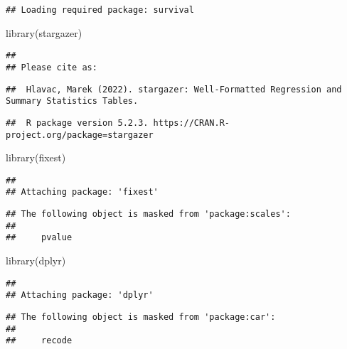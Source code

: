 \documentclass[
]{article}
\newenvironment{Shaded}{\begin{snugshade}}{\end{snugshade}}
\newcommand{\FunctionTok}[1]{\textcolor[rgb]{0.00,0.00,0.00}{#1}}
\newcommand{\NormalTok}[1]{#1}
\begin{document}
\begin{verbatim}
## Loading required package: survival
\end{verbatim}

\begin{Shaded}
\begin{Highlighting}[]
\FunctionTok{library}\NormalTok{(stargazer)}
\end{Highlighting}
\end{Shaded}

\begin{verbatim}
## 
## Please cite as:
\end{verbatim}

\begin{verbatim}
##  Hlavac, Marek (2022). stargazer: Well-Formatted Regression and Summary Statistics Tables.
\end{verbatim}

\begin{verbatim}
##  R package version 5.2.3. https://CRAN.R-project.org/package=stargazer
\end{verbatim}

\begin{Shaded}
\begin{Highlighting}[]
\FunctionTok{library}\NormalTok{(fixest)}
\end{Highlighting}
\end{Shaded}

\begin{verbatim}
## 
## Attaching package: 'fixest'
\end{verbatim}

\begin{verbatim}
## The following object is masked from 'package:scales':
## 
##     pvalue
\end{verbatim}

\begin{Shaded}
\begin{Highlighting}[]
\FunctionTok{library}\NormalTok{(dplyr)}
\end{Highlighting}
\end{Shaded}

\begin{verbatim}
## 
## Attaching package: 'dplyr'
\end{verbatim}

\begin{verbatim}
## The following object is masked from 'package:car':
## 
##     recode
\end{verbatim}
\end{document}
